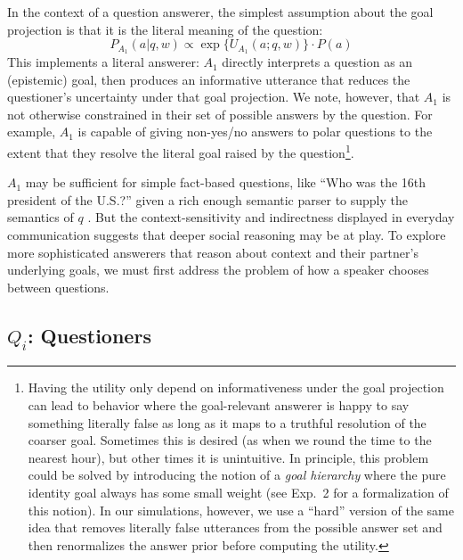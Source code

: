 \documentclass[11pt, floatsintext]{apa6}
\begin{document}
In the context of a question answerer, the simplest assumption about the goal projection is that it is the literal meaning of the question:
$$P_{A_1}(a|q,w) \propto \exp\{U_{A_1}(a; q,w)\} \cdot P(a)$$
This implements a literal answerer: $A_1$ directly interprets a question as an (epistemic) goal, then produces an informative utterance that reduces the questioner's uncertainty under that goal projection.
We note, however, that $A_1$ is not otherwise constrained in their set of possible answers by the question. 
For example, $A_1$ is capable of giving non-yes/no answers to polar questions to the extent that they resolve the literal goal raised by the question\footnote{Having the utility only depend on informativeness under the goal projection can lead to behavior where the goal-relevant answerer is happy to say something literally false as long as it maps to a truthful resolution of the coarser goal. Sometimes this is desired (as when we round the time to the nearest hour), but other times it is unintuitive. In principle, this problem could be solved by introducing the notion of a \emph{goal hierarchy} where the pure identity goal always has some small weight (see Exp.~2 for a formalization of this notion). In our simulations, however, we use a ``hard'' version of the same idea that removes literally false utterances from the possible answer set and then renormalizes the answer prior before computing the utility.}. 

$A_1$ may be sufficient for simple fact-based questions, like ``Who was the 16th president of the U.S.?'' given a rich enough semantic parser to supply the semantics of $q$ \cite{BerantChouFrostigLiang13_FreebaseQAPairs}. 
But the context-sensitivity and indirectness displayed in everyday communication suggests that deeper social reasoning may be at play. 
To explore more sophisticated answerers that reason about context and their partner's underlying goals, we must first address the problem of how a speaker chooses between questions.

\subsection{$Q_i$: Questioners}
\end{document}
